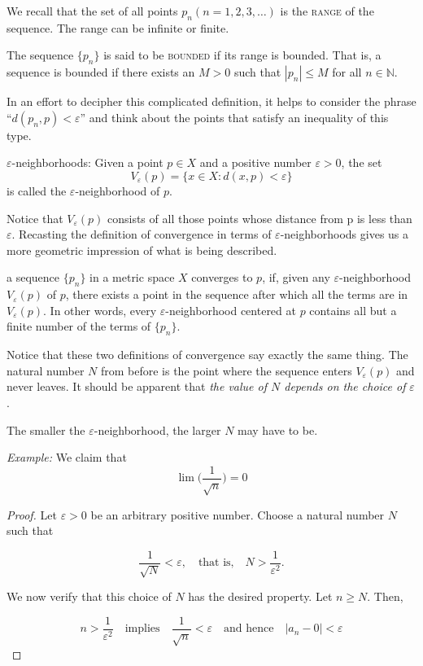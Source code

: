 \begin{definition}
We recall that the set of all points $p_n  (n=1,2,3, \ldots)$  is the \textsc{range} of the sequence.  The range can be infinite or finite.  


 The sequence $\{p_n\}$ is said to be \textsc{bounded} if its range is bounded.  That is, a sequence is bounded if there exists an $M > 0$ such that $|p_n|\leq M$ for all $n \in \mathbb{N}$.\end{definition}


\bigskip
In an effort to decipher this complicated definition, it helps to consider the phrase ``$d(p_n, p) < \varepsilon$'' and think about the points that satisfy an inequality of this type.


\begin{definition}$\varepsilon$-neighborhoods:  Given a point $p \in X$ and a positive number $\varepsilon > 0$,  the set
\[V_{\varepsilon}(p) = \{x \in X: d(x,p)< \varepsilon\}\]
is called the $\varepsilon$-neighborhood of $p$. \end{definition}

Notice that $V_{\varepsilon}(p)$ consists of all those points whose distance from p is less than $\varepsilon$.  Recasting the definition of convergence in terms of $\varepsilon$-neighborhoods gives us a more geometric impression of what is being described.

\begin{definition}  a sequence $\{p_n\}$ in a metric space $X$ converges to $p$, if, given any $\varepsilon$-neighborhood  $V_{\varepsilon}(p)$ of $p$, there exists a point in the sequence after which all the terms are in $V_{\varepsilon}(p)$.  In other words, every $\varepsilon$-neighborhood centered at $p$ contains all but a finite number of the terms of $\{p_n\}$.
\end{definition}

Notice that these two definitions of convergence say exactly the same thing.  The natural number $N$ from before is the point where the sequence enters $V_{\varepsilon}(p)$ and never leaves.  It should be apparent that \emph{the value of $N$ depends on the choice of} $\varepsilon$.   

The smaller the $\varepsilon$-neighborhood, the larger $N$ may have to be.


\noindent \emph{Example:}  We claim that $$ \lim \bigg( \frac{1}{\sqrt{n}} \bigg) = 0 $$

\begin{proof}
Let $\varepsilon >0$ be an arbitrary positive number.  Choose a natural number $N$ such that 

$$	\frac{1}{\sqrt{N}} < \varepsilon, \quad \text{that is,} \quad N > \frac{1}{{\varepsilon}^2}.	$$

We now verify that this choice of $N$ has the desired property.  Let $n \geq N$.  Then,

$$	n> \frac{1}{\varepsilon^2}	  \quad \text{implies} \quad \frac{1}{\sqrt{n}} < \varepsilon \quad \text{and hence} \quad |a_{n} -0|< \varepsilon$$

\end{proof}

